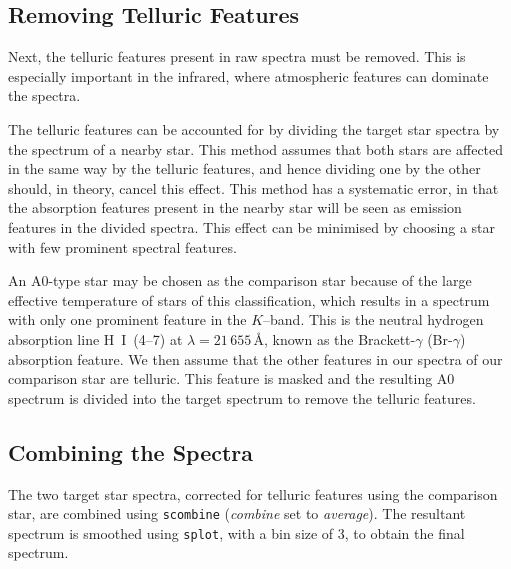 
\subsection{Removing Telluric Features}\label{cha:InfraredDataReductionTechniques:sec:SpectroscopyData:subsec:TelluricFeatures}

Next, the telluric
features present in raw spectra must be removed. This is especially
important in the infrared, where atmospheric features can dominate the
spectra. %

\vspace{\myparskip}

The telluric features can be accounted for by dividing the
target star spectra by the spectrum of a nearby star. This method assumes that both stars are affected in the same way by the telluric features, and hence dividing one by the other should, in theory, cancel this effect. This method has a
systematic error, in that the absorption features present in the nearby
star will be seen as emission features in the divided spectra. This
effect can be minimised by choosing a star with few prominent spectral
features. %

\vspace{\myparskip}

An A0-type star may be chosen as the comparison star because of the
large effective temperature of stars of this classification, which
results in a spectrum with only one prominent feature in the
$K$--band.  This is the neutral hydrogen absorption line \mbox{H I
(4--7)} at $\lambda=21\,655$\,\AA, known as the Brackett-$\gamma$
(Br-$\gamma$) absorption feature. We then assume that the other
features in our spectra of our comparison star are telluric. This feature is masked and the resulting A0 spectrum is divided into the target spectrum to remove the telluric features. %


\subsection{Combining the Spectra}\label{cha:InfraredDataReductionTechniques:sec:SpectroscopyData:subsec:CombiningTheSpectra}

The two target star spectra, corrected for telluric features using the comparison
star, are combined using \texttt{scombine} (\textit{combine} set to
\textit{average}). The resultant spectrum is smoothed using
\texttt{splot}, with a bin size of 3, to obtain the final spectrum. %

